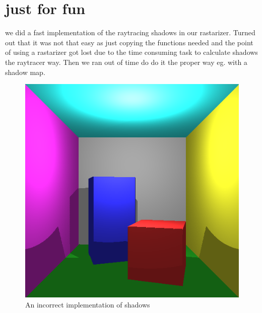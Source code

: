 \documentclass[a4paper,11pt]{article}
\begin{document}
\section{just for fun}
 we did a fast implementation of the raytracing shadows in our rastarizer. Turned out that it was not that easy as just copying the functions needed and the point of using a rastarizer got lost due to the time consuming task to calculate shadows the raytracer way. Then we ran out of time do do it the proper way eg. with a shadow map.
\begin{figure}[h!]
	\centering
	\includegraphics[width=0.45\linewidth]{shadows.png}
	\caption{An incorrect implementation of shadows}
	\label{shadows}
\end{figure}
\end{document}

